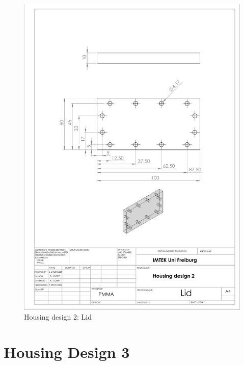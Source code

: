 \begin{figure}[h]%
\centering
\includegraphics[width=1\textwidth]{figures/appendix/housingdesign2lid}%
\caption{Housing design 2: Lid}%
\label{housingdesign2lid}%
\end{figure}

\clearpage

\section{Housing Design 3}

